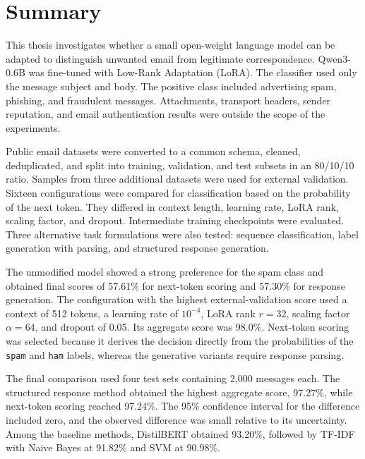 \chapter*{Summary}

\begingroup
\small

This thesis investigates whether a small open-weight language model can be
adapted to distinguish unwanted email from legitimate correspondence.
Qwen3-0.6B was fine-tuned with Low-Rank Adaptation (LoRA). The classifier used
only the message subject and body. The positive class included advertising
spam, phishing, and fraudulent messages. Attachments, transport headers,
sender reputation, and email authentication results were outside the scope of
the experiments.

Public email datasets were converted to a common schema, cleaned, deduplicated,
and split into training, validation, and test subsets in an 80/10/10 ratio.
Samples from three additional datasets were used for external validation. Sixteen
configurations were compared for classification based on the probability of
the next token. They differed in context length, learning rate, LoRA rank,
scaling factor, and dropout. Intermediate training checkpoints were evaluated.
Three alternative task formulations were also tested: sequence classification,
label generation with parsing, and structured response generation.

The unmodified model showed a strong preference for the spam class and obtained
final scores of 57.61\% for next-token scoring and 57.30\% for response
generation. The configuration with the highest external-validation score used
a context of 512 tokens, a learning rate of \(10^{-4}\), LoRA rank \(r=32\),
scaling factor \(\alpha=64\), and dropout of 0.05. Its aggregate score was
98.0\%.
Next-token scoring was selected because it derives the decision directly from
the probabilities of the \texttt{spam} and \texttt{ham} labels, whereas the
generative variants require response parsing.

The final comparison used four test sets containing 2,000 messages each. The
structured response method obtained the highest aggregate score, 97.27\%,
while next-token scoring reached 97.24\%. The 95\% confidence interval for the
difference included zero, and the observed difference was small relative to its
uncertainty. Among the baseline methods,
DistilBERT obtained 93.20\%, followed
by TF-IDF with Naive Bayes at 91.82\% and SVM at 90.98\%.

